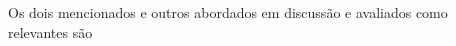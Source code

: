 Os dois \datasets mencionados e outros abordados em discussão e avaliados como
relevantes são

% 
% 
% 

